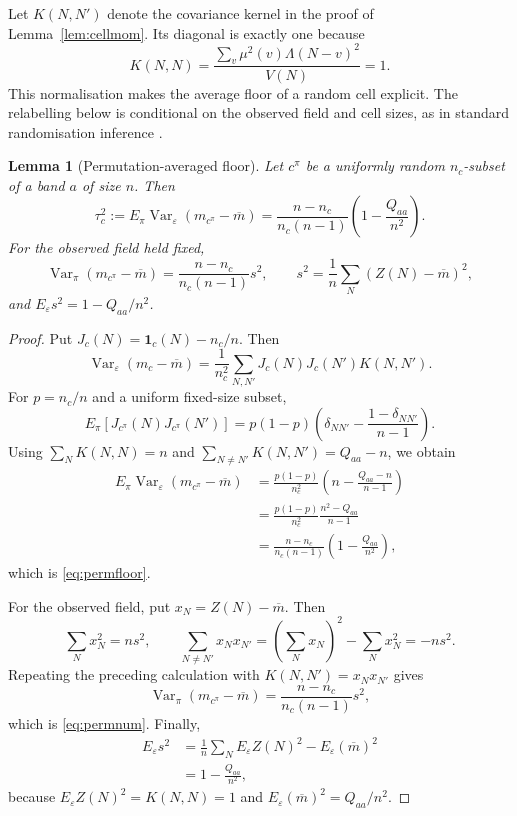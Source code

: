 \documentclass[11pt,a4paper]{article}
\theoremstyle{plain}
\newtheorem{lemma}[theorem]{Lemma}
\theoremstyle{definition}
\theoremstyle{remark}
\begin{document}
Let $K(N,N')$ denote the covariance kernel in the proof of
Lemma~\ref{lem:cellmom}.  Its diagonal is exactly one because
\[
 K(N,N)=\frac{\sum_v\mu^2(v)\Lambda(N-v)^2}{V(N)}=1.
\]
This normalisation makes the average floor of a random cell explicit.
The relabelling below is conditional on the observed field and cell
sizes, as in standard randomisation inference \cite{LR}.

\begin{lemma}[Permutation-averaged floor]\label{lem:permfloor}
Let $c^\pi$ be a uniformly random $n_c$-subset of a band $a$ of size
$n$.  Then
\begin{equation}\label{eq:permfloor}
 \tau_c^2
 :=E_\pi\operatorname{Var}_{\varepsilon}(m_{c^\pi}-\overline m)
 =\frac{n-n_c}{n_c(n-1)}
   \left(1-\frac{Q_{aa}}{n^2}\right).
\end{equation}
For the observed field held fixed,
\begin{equation}\label{eq:permnum}
 \operatorname{Var}_\pi(m_{c^\pi}-\overline m)
 =\frac{n-n_c}{n_c(n-1)}s^2,\qquad
 s^2=\frac1n\sum_N(Z(N)-\overline m)^2,
\end{equation}
and $E_\varepsilon s^2=1-Q_{aa}/n^2$.
\end{lemma}

\begin{proof}
Put $J_c(N)=\mathbf1_c(N)-n_c/n$.  Then
\[
 \operatorname{Var}_{\varepsilon}(m_c-\overline m)
 =\frac1{n_c^2}\sum_{N,N'}J_c(N)J_c(N')K(N,N').
\]
For $p=n_c/n$ and a uniform fixed-size subset,
\[
 E_\pi[J_{c^\pi}(N)J_{c^\pi}(N')]
 =p(1-p)\left(\delta_{NN'}-
 \frac{1-\delta_{NN'}}{n-1}\right).
\]
Using $\sum_NK(N,N)=n$ and
$\sum_{N\ne N'}K(N,N')=Q_{aa}-n$, we obtain
\[
\begin{aligned}
 E_\pi\operatorname{Var}_{\varepsilon}(m_{c^\pi}-\overline m)
 &=\frac{p(1-p)}{n_c^2}
   \left(n-\frac{Q_{aa}-n}{n-1}\right)\\
 &=\frac{p(1-p)}{n_c^2}\frac{n^2-Q_{aa}}{n-1}\\
 &=\frac{n-n_c}{n_c(n-1)}
   \left(1-\frac{Q_{aa}}{n^2}\right),
\end{aligned}
\]
which is \eqref{eq:permfloor}.

For the observed field, put $x_N=Z(N)-\overline m$.  Then
\[
 \sum_Nx_N^2=ns^2,\qquad
 \sum_{N\ne N'}x_Nx_{N'}
 =\left(\sum_Nx_N\right)^2-\sum_Nx_N^2=-ns^2.
\]
Repeating the preceding calculation with
$K(N,N')=x_Nx_{N'}$ gives
\[
 \operatorname{Var}_\pi(m_{c^\pi}-\overline m)
 =\frac{n-n_c}{n_c(n-1)}s^2,
\]
which is \eqref{eq:permnum}.  Finally,
\[
\begin{aligned}
 E_\varepsilon s^2
 &=\frac1n\sum_NE_\varepsilon Z(N)^2
   -E_\varepsilon(\overline m)^2\\
 &=1-\frac{Q_{aa}}{n^2},
\end{aligned}
\]
because $E_\varepsilon Z(N)^2=K(N,N)=1$ and
$E_\varepsilon(\overline m)^2=Q_{aa}/n^2$.
\end{proof}
\end{document}

